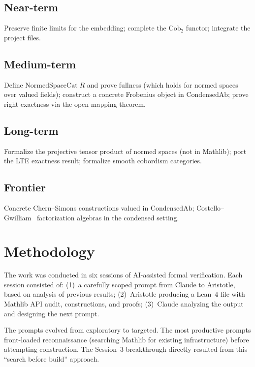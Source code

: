 \documentclass[11pt]{amsart}
\theoremstyle{plain}
\theoremstyle{definition}
\newcommand{\CondAb}{\mathrm{CondensedAb}}
\begin{document}
\subsection{Near-term}
Preserve finite limits for the embedding; complete the $\mathrm{Cob}_2$ functor; integrate the project files.

\subsection{Medium-term}
Define $\mathrm{NormedSpaceCat}\;R$ and prove fullness (which holds for normed spaces over valued fields); construct a concrete Frobenius object in $\CondAb$; prove right exactness via the open mapping theorem.

\subsection{Long-term}
Formalize the projective tensor product of normed spaces (not in Mathlib); port the LTE exactness result; formalize smooth cobordism categories.

\subsection{Frontier}
Concrete Chern--Simons constructions valued in $\CondAb$; Costello--Gwilliam~\cite{CostelloGwilliam2017} factorization algebras in the condensed setting.

\section{Methodology}
\label{sec:methodology}

The work was conducted in six sessions of AI-assisted formal verification. Each session consisted of: (1)~a carefully scoped prompt from Claude to Aristotle, based on analysis of previous results; (2)~Aristotle producing a Lean~4 file with Mathlib API audit, constructions, and proofs; (3)~Claude analyzing the output and designing the next prompt.

The prompts evolved from exploratory to targeted. The most productive prompts front-loaded reconnaissance (searching Mathlib for existing infrastructure) before attempting construction. The Session~3 breakthrough directly resulted from this ``search before build'' approach.
\end{document}

